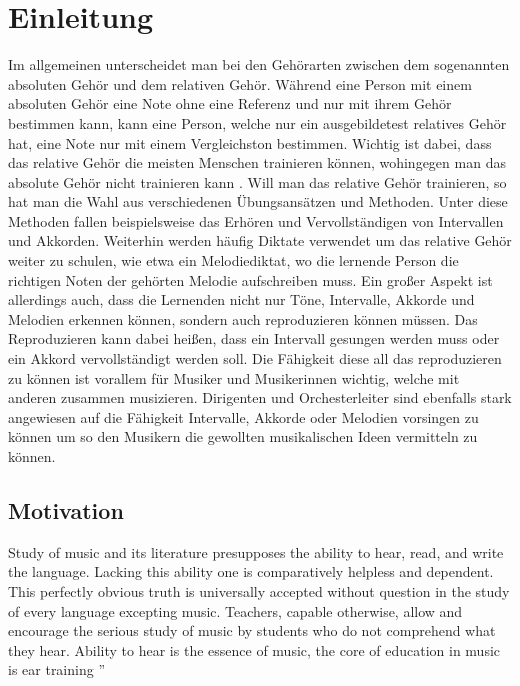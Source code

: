 \begin{abstract}
    
\end{abstract}



\chapter{Einleitung}
Im allgemeinen unterscheidet man bei den Gehörarten zwischen dem sogenannten absoluten Gehör und dem relativen Gehör. Während eine Person mit einem absoluten Gehör eine Note ohne eine Referenz und nur mit ihrem Gehör bestimmen kann, kann eine Person, welche nur ein ausgebildetest relatives Gehör hat, eine Note nur mit einem Vergleichston bestimmen. Wichtig ist dabei, dass das relative Gehör die meisten Menschen trainieren können, wohingegen man das absolute Gehör nicht trainieren kann \cite{gussmack2006latentes}. Will man das relative Gehör trainieren, so hat man die Wahl aus verschiedenen Übungsansätzen und Methoden. Unter diese Methoden fallen beispielsweise das Erhören und Vervollständigen von Intervallen und Akkorden. Weiterhin werden häufig Diktate verwendet um das relative Gehör weiter zu schulen, wie etwa ein Melodiediktat, wo die lernende Person die richtigen Noten der gehörten Melodie aufschreiben muss. Ein großer Aspekt ist allerdings auch, dass die Lernenden nicht nur Töne, Intervalle, Akkorde und Melodien erkennen können, sondern auch reproduzieren können müssen. Das Reproduzieren kann dabei heißen, dass ein Intervall gesungen werden muss oder ein Akkord vervollständigt werden soll. Die Fähigkeit diese all das reproduzieren zu können ist vorallem für Musiker und Musikerinnen wichtig, welche mit anderen zusammen musizieren. Dirigenten und Orchesterleiter sind ebenfalls stark angewiesen auf die Fähigkeit Intervalle, Akkorde oder Melodien vorsingen zu können um so den Musikern die gewollten musikalischen Ideen vermitteln zu können. 

\section{Motivation}
\glqq 
Study of music and
its literature presupposes the ability to hear,
read, and write the language. Lacking this ability one is
comparatively helpless and dependent. This perfectly
obvious truth is universally accepted without question
in the study of every language excepting music. Teachers, capable otherwise, allow and encourage the serious
study of music by students who do not comprehend what
they hear. Ability to hear is the essence of music, the
core of education in music is ear training
''  \cite{spencer1947ear}


